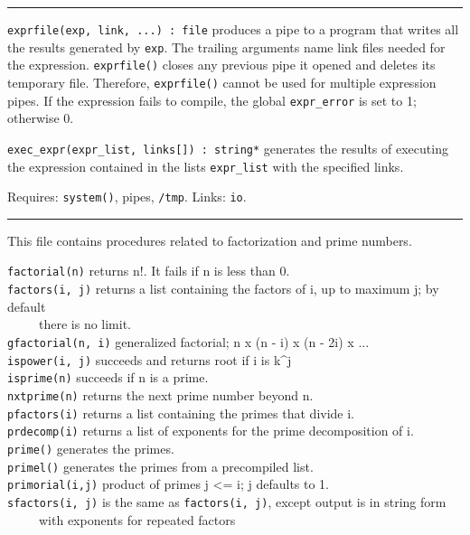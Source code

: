 \vspace{0.25cm}\hrule{}

\texttt{exprfile(exp, link, ...) : file} produces a pipe to a program
that writes all the results generated by \texttt{exp}. The trailing
arguments name link files needed for the expression.
\texttt{exprfile()} closes any previous pipe it opened and deletes its
temporary file. Therefore, \texttt{exprfile()} cannot be used for
multiple expression pipes. If the expression fails to compile, the
global \texttt{expr\_error} is set to 1; otherwise 0. 

\texttt{exec\_expr(expr\_list, links[]) : string*} generates the results
of executing the expression contained in the lists \texttt{expr\_list}
with the specified links.

Requires: \texttt{system()}, pipes, \texttt{/tmp}. Links: \texttt{io}.


\vspace{0.25cm}\hrule{}

This file contains procedures related to factorization and prime
numbers.

\texttt{factorial(n)} returns n!. It fails if n is
less than 0.\\
\texttt{factors(i, j)} returns a list containing the factors of i, up to
maximum j; by default\\
 \ \ \ \ \ there is no limit.\\
\texttt{gfactorial(n, i)} generalized factorial; n x (n - i) x (n - 2i)
x ...\\
\texttt{ispower(i, j)} succeeds and returns root if i is k\^{}j\\
\texttt{is}\texttt{prime(n)} succeeds if n is a
prime.\\
\texttt{nxtprime(n)} returns the next prime number beyond n.\\
\texttt{pfactors(i)} returns a list containing the primes that divide
i.\\
\texttt{prdecomp(i)} returns a list of exponents for the prime
decomposition of i.\\
\texttt{prime()} generates the primes.\\
\texttt{primel()} generates the primes from a precompiled list.\\
\texttt{primorial(i,j)} product of primes j {\textless}= i; j defaults
to 1.\\
\texttt{sfactors(i, j)} is the same as \texttt{factors(i, j)}, except
output is in string form\\
 \ \ \ \ \ with exponents for repeated factors


